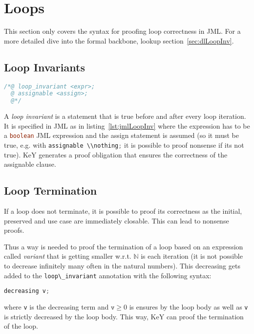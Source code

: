 \documentclass[a4paper, 11pt, accentcolor = tud3b]{tudreport}
\newcommand{\inlineJava}[1]{\lstinline[language = Java]|#1|}
\begin{document}
		\section{Loops}
			This section only covers the syntax for proofing loop correctness in JML. For a more detailed dive into the formal backbone, lookup section~\ref{sec:dlLoopInv}.
		
			\subsection{Loop Invariants}
				\label{sec:loopinv}
			
				\begin{lstlisting}[caption = { Loop Invariants in JML }, label = lst:jmlLoopInv, language = Java]
/*@ loop_invariant <expr>;
  @ assignable <assign>;
  @*/
				\end{lstlisting}
			
				A \textit{loop invariant} is a statement that is true before and after every loop iteration. It is specified in JML as in listing~\ref{lst:jmlLoopInv} where the expression has to be a \inlineJava{boolean} JML expression and the assign statement is assumed (so it must be true, e.g. with \inlineJava{assignable \\nothing;} it is possible to proof nonsense if its not true). KeY generates a proof obligation that ensures the correctness of the assignable clause.
	
			\subsection{Loop Termination}
				If a loop does not terminate, it is possible to proof its correctness as the initial, preserved and use case are immediately closable. This can lead to nonsense proofs.
				
				Thus a way is needed to proof the termination of a loop based on an expression called \textit{variant} that is getting smaller w.r.t. \( \mathbb{N} \) is each iteration (it is not possible to decrease infinitely many often in the natural numbers). This decreasing gets added to the \inlineJava{loop\_invariant} annotation with the following syntax:
				\begin{center}
					\inlineJava{decreasing v;}
				\end{center}
				where \texttt{v} is the decreasing term and \( \texttt{v} \geq 0 \) is ensures by the loop body as well as \texttt{v} is strictly decreased by the loop body. This way, KeY can proof the termination of the loop.
\end{document}
